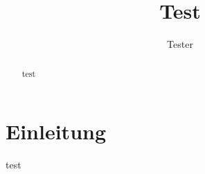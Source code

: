 \documentclass{article}
\title{Test}
\author{Tester}
\begin{document}
	
\maketitle

\begin{abstract}
	test
\end{abstract}

\section{Einleitung}
test
\citep{yabuki1995heat}
\citep{nelson2005bibliography}
\citep{gordon1972chemist,hutchinson1979validity}
\citep{smith2018middle}
\citep{grandstrand:2004}
\citep{ahu61}
\citep{ab94}
\citep{m85}
\citep{ah2006}
\citep{arrow48}
\citep{FudenbergKreps1988}
\citep{slifka2000clinical}




\end{document}

